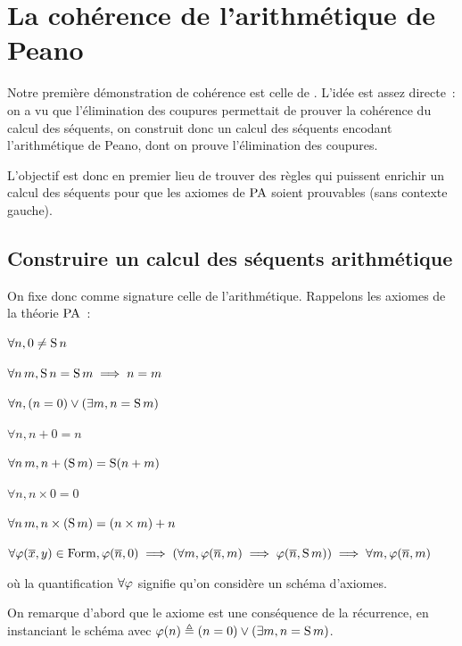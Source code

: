 \section{La cohérence de l'arithmétique de Peano}

Notre première démonstration de cohérence est celle de . L'idée
est assez directe~: on a vu que l'élimination des coupures permettait de prouver
la cohérence du calcul des séquents, on construit donc un calcul des séquents
encodant l'arithmétique de Peano, dont on prouve l'élimination des coupures.

L'objectif est donc en premier lieu de trouver des règles qui puissent
enrichir un calcul des séquents pour que les axiomes de $\operatorname{PA}$ soient
prouvables (sans contexte gauche).

\subsection{Construire un calcul des séquents arithmétique}

On fixe donc comme signature celle de l'arithmétique. Rappelons les axiomes
de la théorie $\operatorname{PA}$~:

\begin{itemize}
  \begin{minipage}{0.45\textwidth}
  \item $\forall n, 0 \neq \operatorname{S} n$
  \item $\forall n\, m, \operatorname{S} n = \operatorname{S} m \implies n = m$
  \item $\forall n, (n = 0) \lor (\exists m, n = \operatorname{S} m)$
  \end{minipage}
  \begin{minipage}{0.45\textwidth}
  \item $\forall n, n + 0 = n$
  \item $\forall n\,m, n + (\operatorname{S} m) = \operatorname{S} (n + m)$
  \item $\forall n, n \times 0 = 0$
  \item $\forall n\,m, n \times (\operatorname{S} m) = (n \times m) + n$
  \end{minipage}
\item $\forall \varphi(\overline{x},y)\in \operatorname{Form}, \varphi(\overline{n},0) \implies
  (\forall m, \varphi(\overline{n},m) \implies \varphi(\overline{n},\operatorname{S} m))\implies
  \forall m, \varphi(\overline{n},m)$
\end{itemize}
où la quantification $\forall \varphi$ signifie qu'on considère un schéma
d'axiomes.

On remarque d'abord que le  axiome est une conséquence
de la récurrence, en instanciant le schéma avec
$\varphi(n) \triangleq (n = 0) \lor (\exists m, n = \operatorname{S} m)$.

